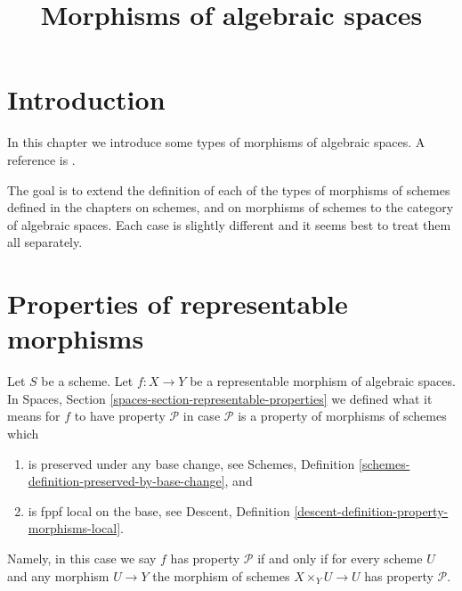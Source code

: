 

%


\title{Morphisms of algebraic spaces}


\maketitle

\label{section-phantom}

\tableofcontents

\section{Introduction}
\label{section-introduction}

\noindent
In this chapter we introduce some types of morphisms of algebraic spaces.
A reference is \cite{Kn}.

\medskip\noindent
The goal is to extend the definition of each of the types of morphisms of
schemes defined in the chapters on schemes, and on morphisms of schemes
to the category of algebraic spaces. Each case is slightly different and
it seems best to treat them all separately.







\section{Properties of representable morphisms}
\label{section-representable}

\noindent
Let $S$ be a scheme.
Let $f : X \to Y$ be a representable morphism of algebraic spaces. In
Spaces, Section \ref{spaces-section-representable-properties}
we defined what it means for $f$ to
have property $\mathcal{P}$ in case $\mathcal{P}$ is a property
of morphisms of schemes which
\begin{enumerate}
\item is preserved under any base change,
see Schemes, Definition \ref{schemes-definition-preserved-by-base-change},
and
\item is fppf local on the base, see
Descent, Definition \ref{descent-definition-property-morphisms-local}.
\end{enumerate}
Namely, in this case we say $f$ has property $\mathcal{P}$ if and only
if for every scheme $U$ and any morphism $U \to Y$ the morphism of schemes
$X \times_Y U \to U$ has property $\mathcal{P}$.

